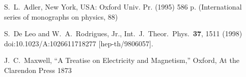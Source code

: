 \documentclass[epsfig,12pt]{article}
\begin{document}
\small
\begin{thebibliography}{99}
\itemsep -2pt

  S.~L.~Adler,
  New York, USA: Oxford Univ. Pr. (1995) 586 p. (International series of monographs on physics, 88)

  S.~De Leo and W.~A.~Rodrigues, Jr.,
  Int.\ J.\ Theor.\ Phys.\  {\bf 37}, 1511 (1998)
  doi:10.1023/A:1026611718277
  [hep-th/9806057].

  J.~C.~Maxwell,
  ``A Treatise on Electricity and Magnetism,''
  Oxford, At the Clarendon Press 1873

\end{thebibliography}
\end{document}
